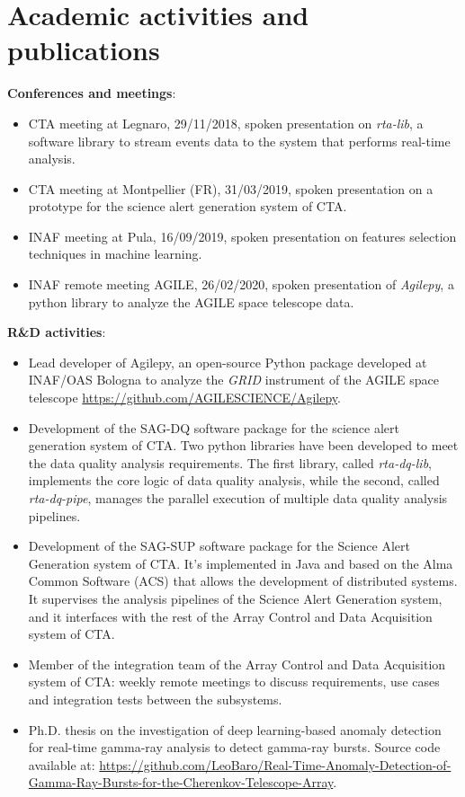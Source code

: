 \chapter*{Academic activities and publications}

\textbf{Conferences and meetings}:
\begin{itemize}
    \item CTA meeting at Legnaro, 29/11/2018, spoken presentation on \textit{rta-lib}, a software library to stream events data to the system that performs real-time analysis.
    \item CTA meeting at Montpellier (FR), 31/03/2019, spoken presentation on a prototype for the science alert generation system of CTA.
    \item INAF meeting at Pula, 16/09/2019, spoken presentation on features selection techniques in machine learning.
    \item INAF remote meeting AGILE, 26/02/2020, spoken presentation of \textit{Agilepy}, a python library to analyze the AGILE space telescope data.
\end{itemize}

\textbf{R\&D activities}:
\begin{itemize}
    \item Lead developer of Agilepy, an open-source Python package developed at INAF/OAS Bologna to analyze the \textit{GRID} instrument of the AGILE space telescope \url{https://github.com/AGILESCIENCE/Agilepy}.
    \item Development of the SAG-DQ software package for the science alert generation system of CTA. Two python libraries have been developed to meet the data quality analysis requirements. The first library, called \textit{rta-dq-lib}, implements the core logic of data quality analysis, while the second, called \textit{rta-dq-pipe}, manages the parallel execution of multiple data quality analysis pipelines.
    \item Development of the SAG-SUP software package for the Science Alert Generation system of CTA. It's implemented in Java and based on the Alma Common Software (ACS) that allows the development of distributed systems. It supervises the analysis pipelines of the Science Alert Generation system, and it interfaces with the rest of the Array Control and Data Acquisition system of CTA.
    \item Member of the integration team of the Array Control and Data Acquisition system of CTA: weekly remote meetings to discuss requirements, use cases and integration tests between the subsystems. 
    \item Ph.D. thesis on the investigation of deep learning-based anomaly detection for real-time gamma-ray analysis to detect gamma-ray bursts. Source code available at: \url{https://github.com/LeoBaro/Real-Time-Anomaly-Detection-of-Gamma-Ray-Bursts-for-the-Cherenkov-Telescope-Array}.
\end{itemize}


